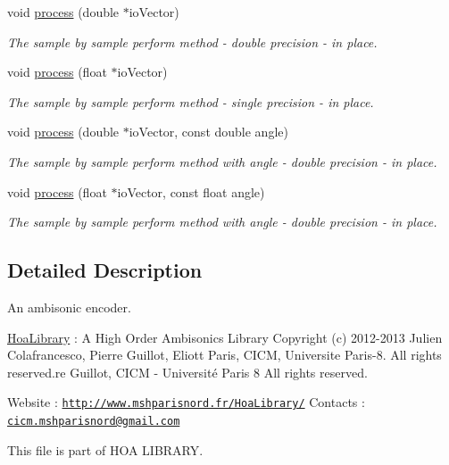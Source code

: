 \begin{DoxyCompactItemize}
void \hyperlink{class_ambisonic_encoder_a7e5cfedb354f5ad134aa19a76a1f61e6}{process} (double $\ast$io\-Vector)
\begin{DoxyCompactList}\small\item\em The sample by sample perform method -\/ double precision -\/ in place. \end{DoxyCompactList}\item 
void \hyperlink{class_ambisonic_encoder_ac8db5ffd1663fd64d8f8e9c701854088}{process} (float $\ast$io\-Vector)
\begin{DoxyCompactList}\small\item\em The sample by sample perform method -\/ single precision -\/ in place. \end{DoxyCompactList}\item 
void \hyperlink{class_ambisonic_encoder_ac68ce0e05589431e54efd91384787e79}{process} (double $\ast$io\-Vector, const double angle)
\begin{DoxyCompactList}\small\item\em The sample by sample perform method with angle -\/ double precision -\/ in place. \end{DoxyCompactList}\item 
void \hyperlink{class_ambisonic_encoder_ab77e6db3e31015c42a066f0f3a6e9a53}{process} (float $\ast$io\-Vector, const float angle)
\begin{DoxyCompactList}\small\item\em The sample by sample perform method with angle -\/ double precision -\/ in place. \end{DoxyCompactList}\end{DoxyCompactItemize}


\subsection{Detailed Description}
An ambisonic encoder. 

\hyperlink{interface_hoa_library}{Hoa\-Library} \-: A High Order Ambisonics Library Copyright (c) 2012-\/2013 Julien Colafrancesco, Pierre Guillot, Eliott Paris, C\-I\-C\-M, Universite Paris-\/8. All rights reserved.\-re Guillot, C\-I\-C\-M -\/ Université Paris 8 All rights reserved.

Website \-: \href{http://www.mshparisnord.fr/HoaLibrary/}{\tt http\-://www.\-mshparisnord.\-fr/\-Hoa\-Library/} Contacts \-: \href{mailto:cicm.mshparisnord@gmail.com}{\tt cicm.\-mshparisnord@gmail.\-com}

This file is part of H\-O\-A L\-I\-B\-R\-A\-R\-Y.

